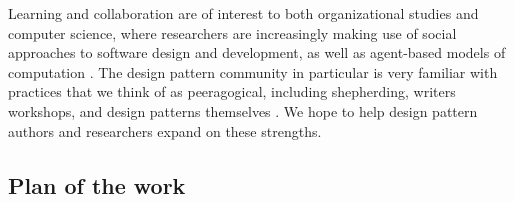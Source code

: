 


Learning and collaboration are of interest to both organizational studies and computer science, where researchers are increasingly making use of social approaches to software design and development, as well as agent-based models of computation \cite{minsky1967programming,poetry-workshop}.
%
The design pattern community in particular is very familiar with practices that we think of as peeragogical, including shepherding, writers workshops, and design patterns themselves \cite{harrison1999language,coplien1997pattern,meszaros1998pattern}.  We hope to help design pattern authors and researchers expand on these strengths.

\subsection*{Plan of the work}


